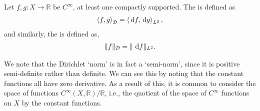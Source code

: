 \begin{definition}
	Let $ f,g:X \to \mathbb{R} $ be $ C ^{\infty} $, at least one compactly
	supported. The  is defined as
	\begin{align*}
		\left\langle f,g \right\rangle _{\mathcal{D}} = \left\langle \operatorname{\, d\!}{f}, \operatorname{\, d\!}{g}
		\right\rangle _{L^2},
	\end{align*}
	and similarly, the  is defined as,
	\begin{align*}
		\|f\|_{\mathcal{D}} = \| \operatorname{\, d\!}{f}\|_{L^2}.
	\end{align*}
\end{definition}

\begin{remark}
	We note that the Dirichlet `norm' is in fact a `semi-norm', since it is
	positive semi-definite rather than definite. We can see this by noting that
	the constant functions all have zero derivative. As a result of this, it is
	common to consider the space of functions $ C ^{\infty}(X,
		\mathbb{R})/\mathbb{R} $, i.e., the quotient of the space of $ C ^{\infty} $
	functions on $ X $ by the constant functions.
\end{remark}

